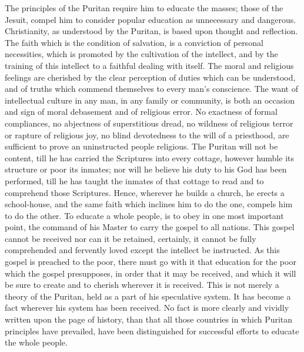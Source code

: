 \documentclass[]{book}
\begin{document}
The principles of the Puritan require him to educate the masses; those of the Jesuit, compel him to consider popular education as unnecessary and dangerous. Christianity, as understood by the Puritan, is based upon thought and reflection. The faith which is the condition of salvation, is a conviction of personal necessities, which is promoted by the cultivation of the intellect, and by the training of this intellect to a faithful dealing with itself. The moral and religious feelings are cherished by the clear perception of duties which can be understood, and of truths which commend themselves to every man's conscience. The want of intellectual culture in any man, in any family or community, is both an occasion and sign of moral debasement and of religious error. No exactness of formal compliances, no abjectness of superstitious dread, no wildness of religious terror or rapture of religious joy, no blind devotedness to the will of a priesthood, are sufficient to prove an uninstructed people religious. The Puritan will not be content, till he has carried the Scriptures into every cottage, however humble its structure or poor its inmates; nor will he believe his duty to his God has been performed, till he has taught the inmates of that cottage to read and to comprehend those Scriptures. Hence, wherever he builds a church, he erects a school-house, and the same faith which inclines him to do the one, compels him to do the other. To educate a whole people, is to obey in one most important point, the command of his Master to carry the gospel to all nations. This gospel cannot be received nor can it be retained, certainly, it cannot be fully comprehended and fervently loved except the intellect be instructed. As this gospel is preached to the poor, there must go with it that education for the poor which the gospel presupposes, in order that it may be received, and which it will be sure to create and to cherish wherever it is received. This is not merely a theory of the Puritan, held as a part of his speculative system. It has become a fact wherever his system has been received. No fact is more clearly and vividly written upon the page of history, than that all those countries in which Puritan principles have prevailed, have been distinguished for successful efforts to educate the whole people.
\end{document}

